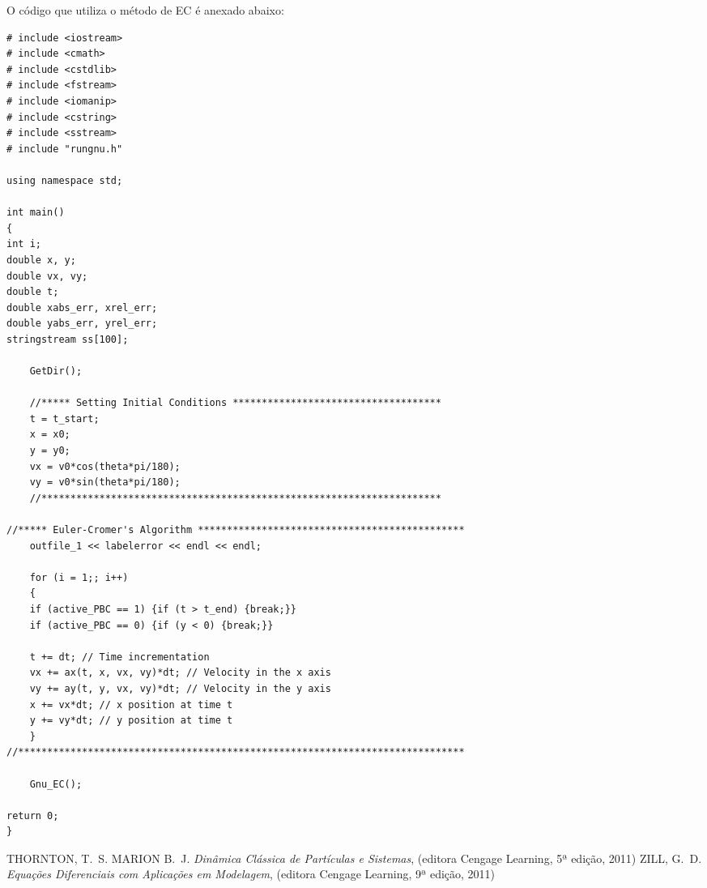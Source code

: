 \documentclass[a4paper, brazilian, 8pt, final]{article}
\begin{document}
\quad O código que utiliza o método de EC é anexado abaixo:

\begin{verbatim}
# include <iostream>
# include <cmath>
# include <cstdlib>
# include <fstream>
# include <iomanip>
# include <cstring>
# include <sstream>
# include "rungnu.h"

using namespace std;

int main()
{
int i;
double x, y;
double vx, vy; 
double t; 
double xabs_err, xrel_err;
double yabs_err, yrel_err;
stringstream ss[100];

	GetDir();

	//***** Setting Initial Conditions ************************************
	t = t_start;
	x = x0;
	y = y0;
	vx = v0*cos(theta*pi/180);
	vy = v0*sin(theta*pi/180);	
	//*********************************************************************

//***** Euler-Cromer's Algorithm **********************************************
	outfile_1 << labelerror << endl << endl;

	for (i = 1;; i++) 
	{
	if (active_PBC == 1) {if (t > t_end) {break;}}
	if (active_PBC == 0) {if (y < 0) {break;}}	

	t += dt; // Time incrementation
	vx += ax(t, x, vx, vy)*dt; // Velocity in the x axis
	vy += ay(t, y, vx, vy)*dt; // Velocity in the y axis
	x += vx*dt; // x position at time t
	y += vy*dt; // y position at time t
	}
//*****************************************************************************

	Gnu_EC();

return 0;
}
\end{verbatim}

\newpage

\begin{thebibliography}{n}
 THORNTON, T.~S. MARION B.~J. {\em Dinâmica Clássica de Partículas e Sistemas}, (editora Cengage Learning, 5ª edição, 2011)
 ZILL, G.~D. {\em Equações Diferenciais com Aplicações em Modelagem}, (editora Cengage Learning, 9ª edição, 2011)
\end{thebibliography}
\end{document}
